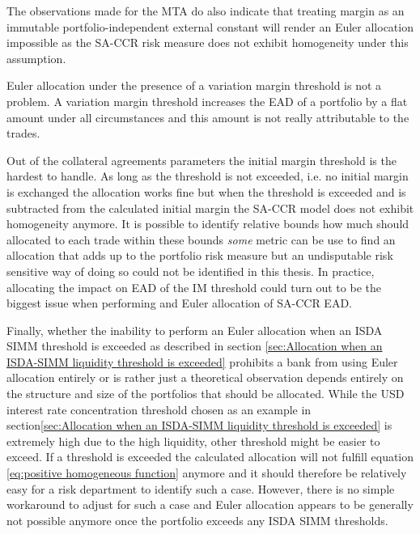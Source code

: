 \documentclass[../Thesis_AHoecherl.tex]{subfiles}
\begin{document}
    The observations made for the MTA do also indicate that treating margin as an immutable portfolio-independent external constant will render an Euler allocation impossible as the SA-CCR risk measure does not exhibit homogeneity under this assumption.

    Euler allocation under the presence of a variation margin threshold is not a problem.
    A variation margin threshold increases the EAD of a portfolio by a flat amount under all circumstances and this amount is not really attributable to the trades.

    Out of the collateral agreements parameters the initial margin threshold is the hardest to handle. As long as the threshold is not exceeded, i.e. no initial margin is exchanged the allocation works fine but when the threshold is exceeded and is subtracted from the calculated initial margin the SA-CCR model does not exhibit homogeneity anymore.
    It is possible to identify relative bounds how much should allocated to each trade within these bounds \emph{some} metric can be use to find an allocation that adds up to the portfolio risk measure but an undisputable risk sensitive way of doing so could not be identified in this thesis.
    In practice, allocating the impact on EAD of the IM threshold could turn out to be the biggest issue when performing and Euler allocation of SA-CCR EAD.

    Finally, whether the inability to perform an Euler allocation when an ISDA SIMM threshold is exceeded as described in section \ref{sec:Allocation when an ISDA-SIMM liquidity threshold is exceeded} prohibits a bank from using Euler allocation entirely or is rather just a theoretical observation depends entirely on the structure and size of the portfolios that should be allocated.
    While the USD interest rate concentration threshold chosen as an example in section\ref{sec:Allocation when an ISDA-SIMM liquidity threshold is exceeded} is extremely high due to the high liquidity, other threshold might be easier to exceed. If a threshold is exceeded the calculated allocation will not fulfill equation \ref{eq:positive homogeneous function} anymore and it should therefore be relatively easy for a risk department to identify such a case. However, there is no simple workaround to adjust for such a case and Euler allocation appears to be generally not possible anymore once the portfolio exceeds any ISDA SIMM thresholds.
\end{document}
